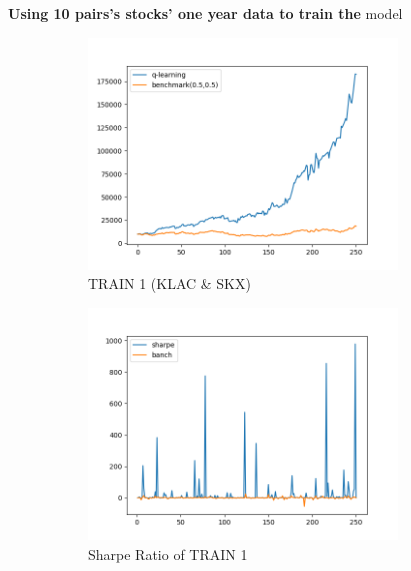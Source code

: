 \textbf{Using 10 pairs’s stocks’ one year data to train the} model
\begin{figure}[H]
\begin{subfigure}{.5\textwidth}%
\centering
\includegraphics[clip, width=0.9\textwidth]{Graphics/trainParameterWithT.png} \caption{TRAIN 1 (KLAC \& SKX)
} 
\end{subfigure}%
\begin{subfigure}{.5\textwidth}%
\centering
\includegraphics[clip, width=0.9\textwidth]{Graphics/trainParameterWTSharpe.png} \caption{Sharpe Ratio of TRAIN 1}
\end{subfigure}%
\vspace{0.1cm}
\begin{subfigure}{.5\textwidth}%
\centering

\end{subfigure}
\end{figure}

